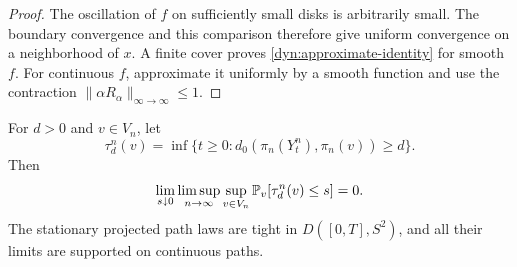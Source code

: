 \begin{proof}
The oscillation of $f$ on sufficiently small disks is arbitrarily
small.  The boundary convergence and this comparison therefore
give uniform convergence on a neighborhood of $x$.  A finite cover
proves \eqref{dyn:approximate-identity} for smooth $f$.
For continuous $f$, approximate it uniformly by a smooth function
and use the contraction $\|\alpha R_\alpha\|_{\infty\to\infty}\le1$.
\end{proof}

\begin{lemma}
\label{dyn:tightness}
For $d>0$ and $v\in V_n$, let
\[
 \tau^n_d(v)=\inf\{t\ge0:
   d_0(\pi_n(Y^n_t),\pi_n(v))\ge d\}.
\]
Then
\begin{equation}\label{dyn:exit}
 \lim_{s\downarrow0}\limsup_{n\to\infty}
       \sup_{v\in V_n}\P_v[\tau^n_d(v)\le s]=0.
\end{equation}
The stationary projected path laws are tight in $D([0,T],S^2)$,
and all their limits are supported on continuous paths.
\end{lemma}

